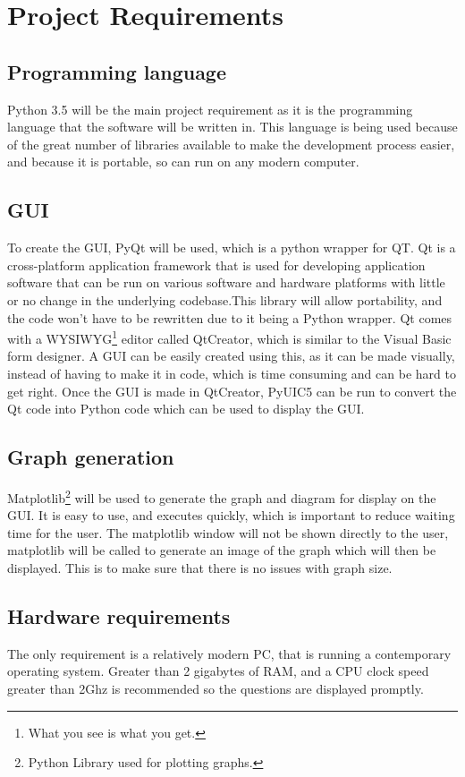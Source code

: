 \section{Project Requirements}
\subsection{Programming language}
Python 3.5 will be the main project requirement as it is the programming language that the software will be written in. This language is being used because of the great number of libraries available to make the development process easier, and because it is portable, so can run on any modern computer.
\subsection{GUI}
To create the GUI, PyQt will be used, which is a python wrapper for QT. Qt is a cross-platform application framework that is used for developing application software that can be run on various software and hardware platforms with little or no change in the underlying codebase\autocite{qt}.This library will allow portability, and the code won't have to be rewritten due to it being a Python wrapper. Qt comes with a WYSIWYG\footnote{What you see is what you get.} editor called QtCreator, which is similar to the Visual Basic form designer. A GUI can be easily created using this, as it can be made visually, instead of having to make it in code, which is time consuming and can be hard to get right. Once the GUI is made in QtCreator, PyUIC5 can be run to convert the Qt code into Python code which can be used to display the GUI.
\subsection{Graph generation}
Matplotlib\footnote{Python Library used for plotting graphs.} will be used to generate the graph and diagram for display on the GUI. It is easy to use, and executes quickly, which is important to reduce waiting time for the user. The matplotlib window will not be shown directly to the user, matplotlib will be called to generate an image of the graph which will then be displayed. This is to make sure that there is no issues with graph size.
\subsection{Hardware requirements}
The only requirement is a relatively modern PC, that is running a contemporary operating system. Greater than 2 gigabytes of RAM, and a CPU clock speed greater than 2Ghz is recommended so the questions are displayed promptly.
